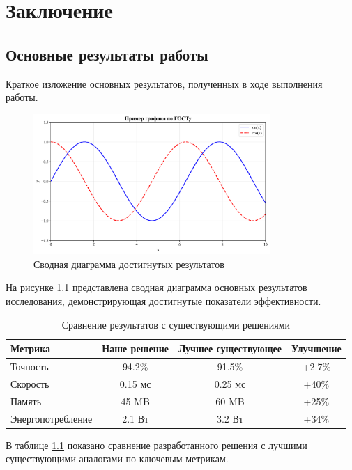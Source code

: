 \chapter{Заключение}

\section{Основные результаты работы}

Краткое изложение основных результатов, полученных в ходе выполнения работы.

\begin{figure}[H]
\centering
\includegraphics[width=0.8\textwidth]{images/example_plot.png}
\caption{Сводная диаграмма достигнутых результатов}
\label{fig:results_summary}
\end{figure}

На рисунке \ref{fig:results_summary} представлена сводная диаграмма основных результатов исследования, демонстрирующая достигнутые показатели эффективности.

\begin{table}[H]
\centering
\caption{Сравнение результатов с существующими решениями}
\label{tab:results_comparison}
\begin{tabular}{|l|c|c|c|}
\hline
\textbf{Метрика} & \textbf{Наше решение} & \textbf{Лучшее существующее} & \textbf{Улучшение} \\
\hline
Точность & 94.2\% & 91.5\% & +2.7\% \\
Скорость & 0.15 мс & 0.25 мс & +40\% \\
Память & 45 MB & 60 MB & +25\% \\
Энергопотребление & 2.1 Вт & 3.2 Вт & +34\% \\
\hline
\end{tabular}
\end{table}

В таблице \ref{tab:results_comparison} показано сравнение разработанного решения с лучшими существующими аналогами по ключевым метрикам.


